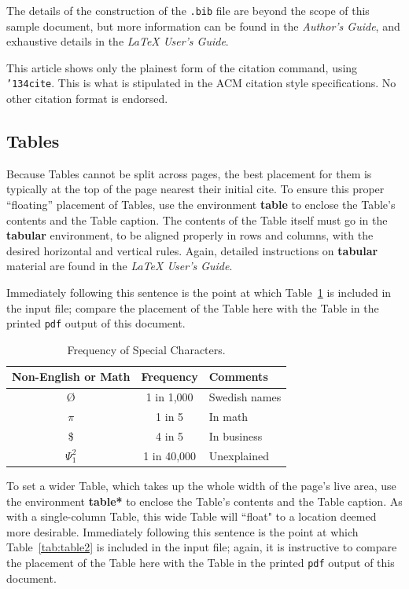 \documentclass[article,english]{stucosrec}
\newcommand{\latex}{\LaTeX\xspace}
\begin{document}
	The details of the construction of the \texttt{.bib} file are beyond the scope of this sample document, but more information can be found in the \textit{Author's Guide}, and exhaustive details in the \textit{\latex User's Guide}\cite{Lamport:LaTeX}.
	
	This article shows only the plainest form of the citation command, using \texttt{{\char'134}cite}.
	This is what is stipulated in the ACM citation style specifications.
	No other citation format is endorsed.
	
	\subsection{Tables}
	
	Because Tables cannot be split across pages, the best placement for them is typically at the top of the page nearest their initial cite.
	To ensure this proper ``floating'' placement of Tables, use the environment \textbf{table} to enclose the Table's contents and the Table caption.
	The contents of the Table itself must go in the \textbf{tabular} environment, to be aligned properly in rows and columns, with the desired horizontal and vertical rules.
	Again, detailed instructions on \textbf{tabular} material are found in the \textit{\latex User's Guide}.
	
	Immediately following this sentence is the point at which Table~\ref{tab:table1} is included in the input file; compare the placement of the Table here with the Table in the printed \texttt{pdf} output of this document.
	
	\begin{table}
		\centering
		\caption{Frequency of Special Characters.}
		\label{tab:table1}
		\begin{tabular}{|c|c|l|} \hline
			Non-English or Math&Frequency&Comments\\ \hline
			\O & 1 in 1,000& Swedish names\\ \hline
			$\pi$ & 1 in 5& In math\\ \hline
			\$ & 4 in 5 & In business\\ \hline
			$\Psi^2_1$ & 1 in 40,000& Unexplained \\ \hline
		\end{tabular}
	\end{table}

	To set a wider Table, which takes up the whole width of the page's live area, use the environment \textbf{table*} to enclose the Table's contents and the Table caption.
	As with a single-column Table, this wide Table will ``float" to a location deemed more desirable.
	Immediately following this sentence is the point at which Table~\ref{tab:table2} is included in the input file; again, it is instructive to compare the placement of the Table here with the Table in the printed \texttt{pdf} output of this document.
	
\end{document}
